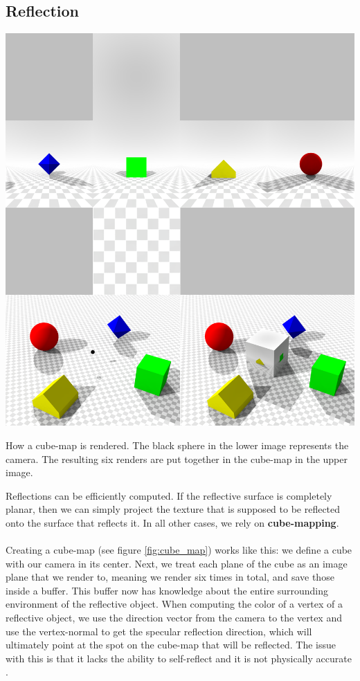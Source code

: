 \documentclass{ACGSeminar}
\begin{document}
	\subsection{Reflection} \label{sec:reflection}%
		\begin{floatingfigure}[r]{.5\textwidth}%
			\includegraphics[width=.5\textwidth]{img/cube_map.png}
			\caption{How a cube-map is rendered. The black sphere in the lower image represents the camera. The resulting six renders are put together in the cube-map in the upper image.}%
			\label{fig:cube_map}%
		\end{floatingfigure}%
		Reflections can be efficiently computed. If the reflective surface is completely planar, then we can simply project the texture that is supposed to be reflected onto the surface that reflects it. In all other cases, we rely on \textbf{cube-mapping}. \\\\
		Creating a cube-map (see figure \ref{fig:cube_map}) works like this: we define a cube with our camera in its center. Next, we treat each plane of the cube as an image plane that we render to, meaning we render six times in total, and save those inside a buffer. This buffer now has knowledge about the entire surrounding environment of the reflective object. When computing the color of a vertex of a reflective object, we use the direction vector from the camera to the vertex and use the vertex-normal to get the specular reflection direction, which will ultimately point at the spot on the cube-map that will be reflected. The issue with this is that it lacks the ability to self-reflect and it is not physically accurate \cite{REFL}.  \\\\\\\\\\\
\end{document}
